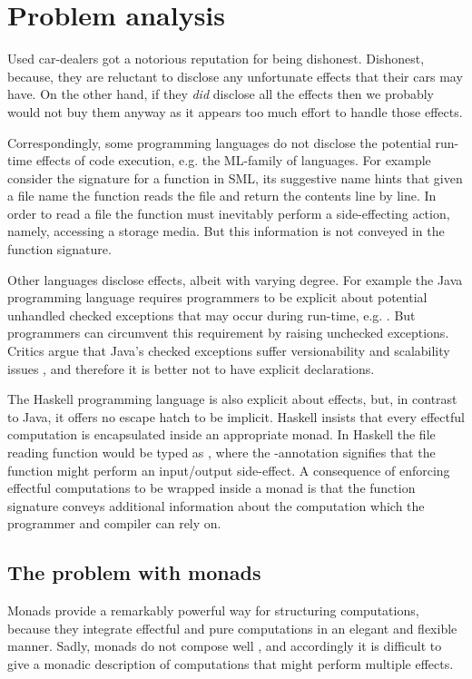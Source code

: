 \section{Problem analysis}
Used car-dealers got a notorious reputation for being dishonest. Dishonest, because, they are reluctant to disclose any unfortunate effects that their cars may have. On the other hand, if they \emph{did} disclose all the effects then we probably would not buy them anyway as it appears too much effort to handle those effects.

Correspondingly, some programming languages do not disclose the potential run-time effects of code execution, e.g. the ML-family of languages. For example consider the signature  for a function in SML, its suggestive name hints that given a file name the function reads the file and return the contents line by line. In order to read a file the function must inevitably perform a side-effecting action, namely, accessing a storage media. But this information is not conveyed in the function signature.

Other languages disclose effects, albeit with varying degree. For example the Java programming language requires programmers to be explicit about potential unhandled checked exceptions that may occur during run-time, e.g. . But programmers can circumvent this requirement by raising unchecked exceptions. Critics argue that Java's checked exceptions suffer versionability and scalability issues \cite{Venners03}, and therefore it is better not to have explicit  declarations.

The Haskell programming language is also explicit about effects, but, in contrast to Java, it offers no escape hatch to be implicit. Haskell insists that every effectful computation is encapsulated inside an appropriate monad. In Haskell the file reading function would be typed as , where the -annotation signifies that the function might perform an input/output side-effect. A consequence of enforcing effectful computations to be wrapped inside a monad is that the function signature conveys additional information about the computation which the programmer and compiler can rely on. 

\subsection{The problem with monads}
Monads provide a remarkably powerful way for structuring computations, because they integrate effectful and pure computations in an elegant and flexible manner.
Sadly, monads do not compose well \cite{Kammar2013}, and accordingly it is difficult to give a monadic description of computations that might perform multiple effects.

